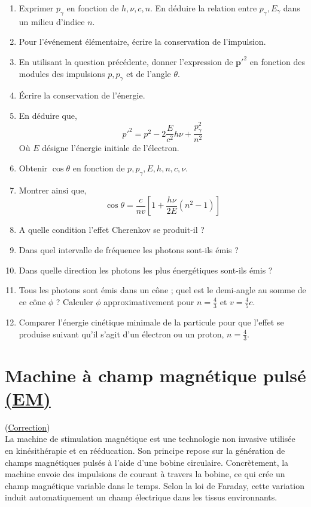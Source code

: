\documentclass[a4paper,10pt]{report}
\begin{document}
	\begin{enumerate}
\item Exprimer $p_\gamma$ en fonction de $h, \nu, c, n$. En déduire la relation entre $p_\gamma, E_\gamma$ dans un milieu d'indice $n$.
\item Pour l'événement élémentaire, écrire la conservation de l'impulsion.
\item En utilisant la question précédente, donner l'expression de ${\textbf{p}'}^2$ en fonction des modules des impulsions $p, p_\gamma$ et de l'angle $\theta$.
\item Écrire la conservation de l'énergie.
\item En déduire que,
$${p'}^2 = p^2 - 2 \frac E {c^2}h\nu + \frac{p_\gamma^2}{n^2}$$
Où $E$ désigne l'énergie initiale de l'électron.
\item Obtenir $\cos\theta$ en fonction de $p, p_\gamma, E, h, n, c, \nu$.
\item Montrer ainsi que,
$$\cos\theta = \frac c {nv}[1 + \frac{h\nu}{2E}(n^2-1)]$$
\item A quelle condition l'effet Cherenkov se produit-il ?
\item Dans quel intervalle de fréquence les photons sont-ils émis ?
\item Dans quelle direction les photons les plus énergétiques sont-ils émis ?
\item Tous les photons sont émis dans un cône ;  quel est le demi-angle au somme de ce cône $\phi$ ? Calculer $\phi$ approximativement pour $n = \frac 4 3$ et $v = \frac 4 5 c$.
\item Comparer l'énergie cinétique minimale de la particule pour que l'effet se produise suivant qu'il s'agit d'un électron ou un proton, $n = \frac 43$.
	\end{enumerate}
	\newpage \section[Machine à champ magnétique pulsé]{Machine à champ magnétique pulsé \hyperref[subsubsec:maxwell]{(EM)}\space \faStar\faStar}\label{subsec:machine}
	(\hyperref[subsec:correctionmachine]{Correction})\\
	
La machine de stimulation magnétique est une technologie non invasive utilisée en kinésithérapie et en rééducation. Son principe repose sur la génération de champs magnétiques pulsés à l'aide d'une bobine circulaire. Concrètement, la machine envoie des impulsions de courant à travers la bobine, ce qui crée un champ magnétique variable dans le temps. Selon la loi de Faraday, cette variation induit automatiquement un champ électrique dans les tissus environnants.
\end{document}
